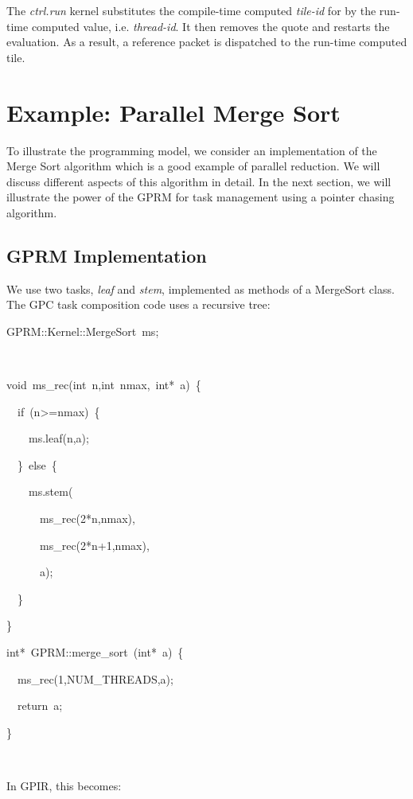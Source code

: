 \documentclass[copyright,creativecommons]{eptcs}
\newenvironment{lyxcode}
{\par\begin{list}{}{
\setlength{\rightmargin}{\leftmargin}
\setlength{\listparindent}{0pt}\raggedright
\setlength{\itemsep}{0pt}
\setlength{\parsep}{0pt}
\normalfont\ttfamily}\item[]}
{\end{list}}
\begin{document}
The \emph{ctrl.run} kernel substitutes the compile-time computed \emph{tile-id}
for  by the run-time computed value, i.e. \emph{thread-id}.
It then removes the quote and restarts the evaluation. As a result,
a reference packet is dispatched to the run-time computed tile.


\section{Example: Parallel Merge Sort}

To illustrate the programming model, we consider an implementation
of the Merge Sort algorithm which is a good example of parallel reduction.
We will discuss different aspects of this algorithm in detail. In
the next section, we will illustrate the power of the GPRM for task
management using a pointer chasing algorithm.


\subsection{GPRM Implementation}

We use two tasks, \emph{leaf} and \emph{stem}, implemented as methods
of a MergeSort class. The GPC task composition code uses a recursive
tree: 
\begin{lyxcode}
{\small GPRM::Kernel::MergeSort~ms;}{\small \par}

~

{\small void~ms\_rec(int~n,int~nmax,~int{*}~a)~\{}{\small \par}

{\small{}~~if~(n>=nmax)~\{}{\small \par}

{\small{}~~~~ms.leaf(n,a);~}{\small \par}

{\small{}~~\}~else~\{}{\small \par}

{\small{}~~~~ms.stem(}{\small \par}

{\small{}~~~~~~ms\_rec(2{*}n,nmax),}{\small \par}

{\small{}~~~~~~ms\_rec(2{*}n+1,nmax),}{\small \par}

{\small{}~~~~~~a);}{\small \par}

{\small{}~~\}}{\small \par}

\}



{\small int{*}~GPRM::merge\_sort~(int{*}~a)~\{}{\small \par}

{\small{}~~ms\_rec(1,NUM\_THREADS,a);~}{\small \par}

{\small{}~~return~a;}{\small \par}

{\small \}}{\small \par}

~
\end{lyxcode}
In GPIR, this becomes:
\end{document}
